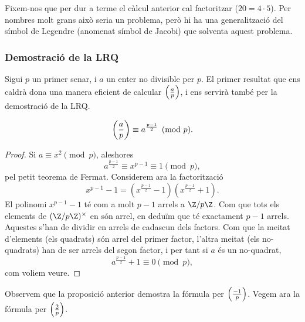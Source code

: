 Fixem-nos que per dur a terme el càlcul anterior cal factoritzar ($20=4\cdot 5$). Per nombres molt grans això seria un problema, però hi ha una generalització del símbol de Legendre (anomenat símbol de Jacobi) que solventa aquest problema.

\subsubsection{Demostració de la LRQ}

Sigui $p$ un primer senar, i $a$ un enter no divisible per $p$. El primer resultat que ens caldrà dona una manera eficient de calcular $\left(\frac{a}{p}\right)$, i ens servirà també per la demostració de la LRQ.
\begin{proposition}
 \[
 \left(\frac{a}{p}\right) \equiv a^{\frac{p-1}{2}}\pmod p.
 \]
\end{proposition}
\begin{proof}
Si $a\equiv x^2\pmod p$, aleshores
\[
a^{\frac{p-1}{2}} \equiv x^{p-1}\equiv 1\pmod p,
\]
pel petit teorema de Fermat. Considerem ara la factorització
\[
x^{p-1}-1 = (x^{\frac{p-1}{2}}-1)(x^{\frac{p-1}{2}}+1).
\]
El polinomi $x^{p-1}-1$ té com a molt $p-1$ arrels a $\Z/p\Z$. Com que tots els elements de $(\Z/p\Z)^\times$ en són arrel, en deduïm que té exactament $p-1$ arrels. Aquestes s'han de dividir en arrels de cadascun dels factors. Com que la meitat d'elements (els quadrats) són arrel del primer factor, l'altra meitat (els no-quadrats) han de ser arrels del segon factor, i per tant si $a$ és un no-quadrat,
\[
a^{\frac{p-1}{2}}+1\equiv0\pmod p,
\]
com voliem veure.
\end{proof}

Observem que la proposició anterior demostra la fórmula per $\left(\frac{-1}{p}\right)$. Vegem ara la fórmula per $\left(\frac{2}{p}\right)$.

